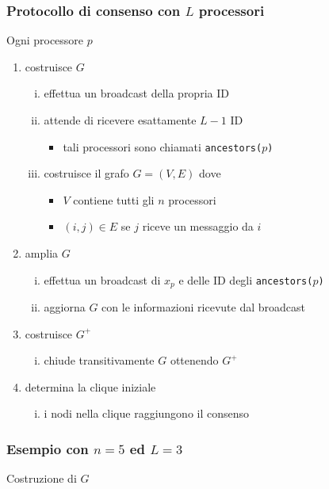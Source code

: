 \documentclass{beamer}
\begin{document}
\begin{frame}\frametitle{Protocollo di consenso con $L$ processori}
Ogni processore $p$
\begin{enumerate}
	\item<1->costruisce $G$
	\begin{enumerate}[i)]
		\item<1-> effettua un broadcast della propria ID
		\item<1-> attende di ricevere esattamente $L-1$ ID
		\begin{itemize}
			\item<1-> tali processori sono chiamati \texttt{ancestors($p$)}
		\end{itemize}
		\item<1-> costruisce il grafo $G=(V,E)$ dove
		\begin{itemize}
			\item<1-> $V$ contiene tutti gli $n$ processori
			\item $(i,j)\in E$ se $j$ riceve un messaggio da $i$
		\end{itemize}
	\end{enumerate}

	\item<2-> amplia $G$
	\begin{enumerate}[i)]
		\item<2-> effettua un broadcast di $x_p$ e delle ID degli \texttt{ancestors($p$)}
		\item<2-> aggiorna $G$ con le informazioni ricevute dal broadcast
	\end{enumerate}

	\item<3-> costruisce $G^+$
	\begin{enumerate}[i)]
		\item<3-> chiude transitivamente $G$ ottenendo $G^+$
	\end{enumerate}
	
	\item<4-> determina la clique iniziale
	\begin{enumerate}[i)]
		\item<4-> i nodi nella clique raggiungono il consenso
	\end{enumerate}
\end{enumerate}
\end{frame}


\begin{frame}\frametitle{Esempio con $n=5$ ed $L=3$}
Costruzione di $G$
\begin{figure}\centering\end{figure}
\end{frame}
\end{document}
